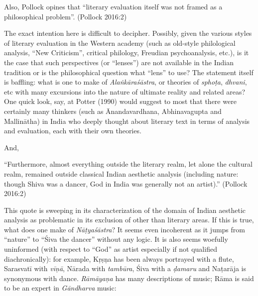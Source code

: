 \newpage

Also, Pollock opines that “literary evaluation itself was not framed as a philosophical problem”. (Pollock 2016:2)

The exact intention here is difficult to decipher. Possibly, given the various styles of literary evaluation in the Western academy (such as old-style philological analysis, “New Criticism”, critical philology, Freudian psychoanalysis, etc.), is it the case that such perspectives (or “lenses”) are not available in the Indian tradition or is the philosophical question what “lens” to use? The statement itself is baffling: what is one to make of \textsl{Alaṅkāraśāstra}, or theories of \textsl{sphoṭa}, \textsl{dhvani}, etc with many excursions into the nature of ultimate reality and related areas? One quick look, say, at Potter (1990) would suggest to most that there were certainly many thinkers (such as Ānandavardhana, Abhinavagupta and Mallinātha) in India who deeply thought about literary text in terms of analysis and evaluation, each with their own theories.

And, 

\begin{myquote}
“Furthermore, almost everything outside the literary realm, let alone the cultural realm, remained outside classical Indian aesthetic analysis (including nature: though Shiva was a dancer, God in India was generally not an artist).” \hfill (Pollock 2016:2)
\end{myquote}

This quote is sweeping in its characterization of the domain of Indian aesthetic analysis as problematic in its exclusion of other than literary areas. If this is true, what does one make of \textsl{Nāṭyaśāstra}? It seems even incoherent as it jumps from “nature” to “Śiva the dancer” without any logic. It is also seems woefully uninformed (with respect to “God” as artist especially if not qualified diachronically): for example, Kṛṣṇa has been always portrayed with a flute, Sarasvatī with \textsl{vīṇā}, Nārada with \textsl{tambūra}, Śiva with a \textsl{ḍamaru} and Naṭarāja is synonymous with dance. \textsl{Rāmāyaṇa} has many descriptions of music; Rāma is said to be an expert in \textsl{Gāndharva} music:

